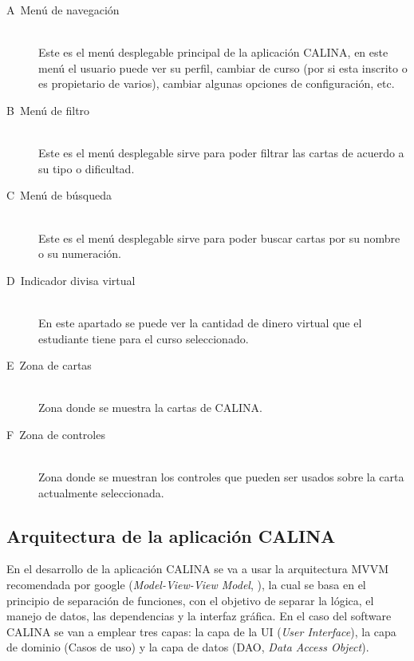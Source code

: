 \begin{description}
  \item[\textlangle A\textrangle\ Menú de navegación] \hfill \\ Este es el menú desplegable principal de la 
	aplicación CALINA, en este menú el usuario puede ver su perfil, cambiar de curso (por si esta 
	inscrito o es propietario de varios), cambiar algunas opciones de configuración, etc.
  \item[\textlangle B\textrangle\ Menú de filtro] \hfill \\ Este es el menú desplegable sirve para poder 
	filtrar las cartas de acuerdo a su tipo o dificultad.
  \item[\textlangle C\textrangle\ Menú de búsqueda] \hfill \\ Este es el menú desplegable sirve para poder 
	buscar cartas por su nombre o su numeración.
  \item[\textlangle D\textrangle\ Indicador divisa virtual] \hfill \\ En este apartado se puede ver la 
	cantidad de dinero virtual que el estudiante tiene para el curso seleccionado.
  \item[\textlangle E\textrangle\ Zona de cartas] \hfill \\ Zona donde se muestra la cartas de CALINA.
  \item[\textlangle F\textrangle\ Zona de controles] \hfill \\ Zona donde se muestran los controles que pueden 
	ser usados sobre la carta actualmente seleccionada.
\end{description}

\subsection{Arquitectura de la aplicación CALINA}

En el desarrollo de la aplicación CALINA se va a usar la arquitectura MVVM recomendada por google 
(\textit{Model-View-View Model}, ), la cual se basa en el principio de separación de 
funciones, con el objetivo de separar la lógica, el manejo de datos, las dependencias y la interfaz gráfica. 
En el caso del software CALINA se van a emplear tres capas: la capa de la UI (\textit{User Interface}), la 
capa de dominio (Casos de uso) y la capa de datos (DAO, \textit{Data Access Object}).

